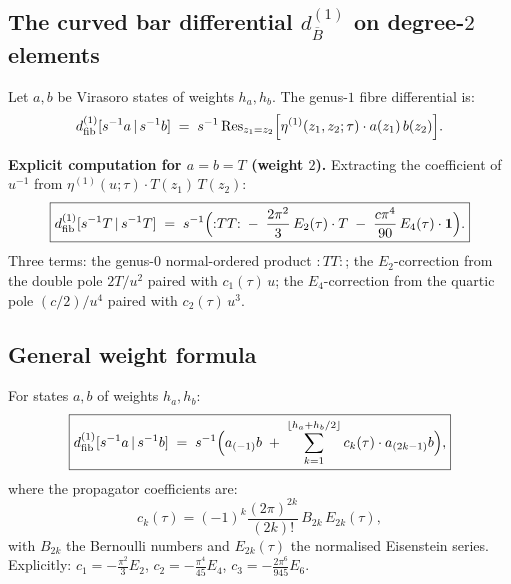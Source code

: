 \documentclass[11pt]{article}
\newcommand{\barB}{\overline{B}}
\newcommand{\dfib}{d_{\mathrm{fib}}}
\begin{document}
\subsection{The curved bar differential $d_{\barB}^{(1)}$ on
  degree-$2$ elements}
\label{subsec:wn-curved-differential}

Let $a, b$ be Virasoro states of weights $h_a, h_b$.
The genus-$1$ fibre differential is:
\begin{equation}\label{eq:wn-dfib-genus1}
\dfib^{(1)}[s^{-1}a \,|\, s^{-1}b]
\;=\;
s^{-1}\operatorname{Res}_{z_1 = z_2}\Bigl[
  \eta^{(1)}(z_1, z_2;\tau) \cdot a(z_1)\,b(z_2)
\Bigr].
\end{equation}

\noindent\textbf{Explicit computation for $a = b = T$ (weight $2$).}
Extracting the coefficient of $u^{-1}$ from
$\eta^{(1)}(u;\tau)\cdot T(z_1)\,T(z_2)$:
\begin{equation}\label{eq:wn-dfib-TT}
\boxed{
\dfib^{(1)}[s^{-1}T \,|\, s^{-1}T]
\;=\;
s^{-1}\Bigl(
  {:}TT{:}
  \;-\; \frac{2\pi^2}{3}\,E_2(\tau)\cdot T
  \;-\; \frac{c\pi^4}{90}\,E_4(\tau)\cdot \mathbf{1}
\Bigr).
}
\end{equation}
Three terms: the genus-$0$ normal-ordered product ${:}TT{:}$;
the $E_2$-correction from the double pole $2T/u^2$ paired with
$c_1(\tau)\,u$; the $E_4$-correction from the quartic pole
$(c/2)/u^4$ paired with $c_2(\tau)\,u^3$.

\subsection{General weight formula}
\label{subsec:wn-general-weight}

For states $a, b$ of weights $h_a, h_b$:
\begin{equation}\label{eq:wn-general-weight}
\boxed{
\dfib^{(1)}[s^{-1}a \,|\, s^{-1}b]
\;=\;
s^{-1}\Bigl(
  a_{(-1)}b
  \;+\;
  \sum_{k=1}^{\lfloor h_a+h_b/2\rfloor}
  c_k(\tau)\cdot a_{(2k-1)}b
\Bigr),
}
\end{equation}
where the propagator coefficients are:
\begin{equation}\label{eq:wn-propagator-coeffs}
c_k(\tau) = (-1)^k\frac{(2\pi)^{2k}}{(2k)!}\,B_{2k}\,E_{2k}(\tau),
\end{equation}
with $B_{2k}$ the Bernoulli numbers and $E_{2k}(\tau)$ the
normalised Eisenstein series.  Explicitly:
$c_1 = -\frac{\pi^2}{3}E_2$,
$c_2 = -\frac{\pi^4}{45}E_4$,
$c_3 = -\frac{2\pi^6}{945}E_6$.
\end{document}
